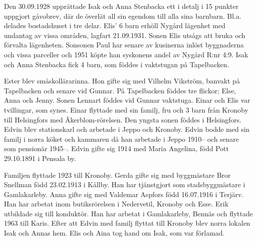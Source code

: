 Den 30.09.1928 upprättade Isak och Anna Stenbacka ett i detalj i 15 punkter uppgjort gåvobrev, där de överlät all sin egendom till alla sina barnbarn.  Bl.a. delades bostadshuset i tre delar. Elis' 6 barn erhöll Nygård lägenhet med undantag av vissa områden, lagfart 21.09.1931. Sonen Elis utsågs att bruka och förvalta lägenheten. Sonsonen Paul har senare av kusinerna inlöst byggnaderna och vissa parceller och 1951 köpte han syskonens andel av Nygård R:nr 4:9.
Isak och Anna Stenbacka fick 4 barn, som föddes i vaktstugan på Tapelbacken.
\begin{jhchildren}
  \item {}
  \item {}
  \item {}
  \item {}
\end{jhchildren}
Ester blev småskollärarinna. Hon gifte sig med Vilhelm Vikström, banvakt på Tapelbacken och senare vid Gunnar. På Tapelbacken föddes tre flickor; Else, Anna och Jenny. Sonen Lennart föddes vid Gunnar vaktstuga.
Einar och Elis var tvillingar, som synes. Einar flyttade med sin familj, fru och 3 barn från Kronoby till Helsingfors med Åkerblom-rörelsen. Den yngsta sonen föddes i Helsingfors. Edvin blev stationskarl och arbetade i Jeppo och Kronoby. Edvin bodde med sin familj i norra köket och kammaren då han arbetade i Jeppo 1910-- och senare som pensionär 1945--. Edvin gifte sig 1914 med Maria Angelina, född Pott 29.10.1891 i Pensala by.
\begin{jhchildren}
  \item {}
  \item {}
  \item {}
  \item {}
\end{jhchildren}
Familjen flyttade 1923 till Kronoby.
Gerda gifte sig med byggmästare Bror Snellman född 23.02.1913 i Kållby. Han har tjänstgjort som stadsbyggmästare i Gamlakarleby. Anna gifte sig med Valdemar Aspfors född 16.07.1916 i Terjärv. Han har arbetat inom butiksrörelsen i Nedervetil, Kronoby och Esse. Erik utbildade sig till konduktör. Han har arbetat i Gamlakarleby, Bennäs och flyttade 1963 till Karis. Efter att Edvin med familj flyttat till Kronoby blev norra lokalen Isak och Annas hem. Elis och Aina tog hand om Isak, som var förlamad.

